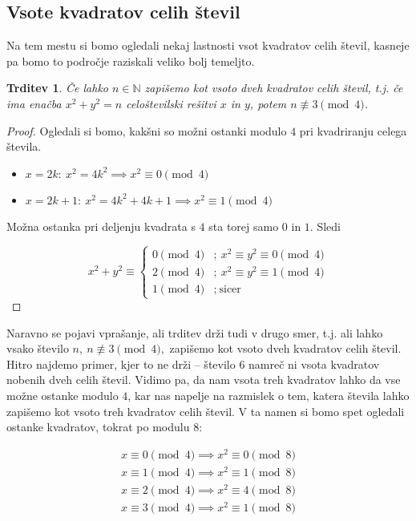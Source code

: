 \documentclass[12pt, a4paper]{article}
\newtheorem{trd}{Trditev}
\begin{document}
\subsection{Vsote kvadratov celih števil}

Na tem mestu si bomo ogledali nekaj lastnosti vsot kvadratov celih števil, kasneje pa bomo to področje raziskali veliko bolj temeljto.

\begin{trd}
Če lahko $n\in \mathbb{N}$ zapišemo kot vsoto dveh kvadratov celih števil, t.j. če ima enačba $x^2 + y^2 = n$ celoštevilski rešitvi $x$ in $y$, potem $n\not\equiv 3 \pmod{4}$.
\end{trd}

\begin{proof}
Ogledali si bomo, kakšni so možni ostanki modulo $4$ pri kvadriranju celega števila.
\begin{itemize}
\item $x=2k:\ x^2 = 4k^2 \implies x^2 \equiv 0 \pmod4$
\item $x=2k+1:\ x^2= 4k^2 + 4k + 1 \implies x^2 \equiv 1 \pmod4$
\end{itemize}
Možna ostanka pri deljenju kvadrata s $4$ sta torej samo $0$ in $1$. Sledi

\[
x^2 + y^2\equiv
\begin{cases}
0 \pmod4 &;\ x^2\equiv y^2 \equiv 0 \pmod4 \\
2 \pmod4 &;\ x^2\equiv y^2 \equiv 1 \pmod4 \\
1 \pmod4 &;\ \text{sicer}
\end{cases}
\]
\end{proof}

Naravno se pojavi vprašanje, ali trditev drži tudi v drugo smer, t.j. ali lahko vsako število $n,\ n\not\equiv 3 \pmod4,$ zapišemo kot vsoto dveh kvadratov celih števil. Hitro najdemo primer, kjer to ne drži -- število $6$ namreč ni vsota kvadratov nobenih dveh celih števil. Vidimo pa, da nam vsota treh kvadratov lahko da vse možne ostanke modulo $4$, kar nas napelje na razmislek o tem, katera števila lahko zapišemo kot vsoto treh kvadratov celih števil. V ta namen si bomo spet ogledali ostanke kvadratov, tokrat po modulu $8$:

\begin{align*}
x\equiv 0 \pmod4 \implies x^2 \equiv 0 \pmod8 \\
x\equiv 1 \pmod4 \implies x^2 \equiv 1 \pmod8 \\
x\equiv 2 \pmod4 \implies x^2 \equiv 4 \pmod8 \\
x\equiv 3 \pmod4 \implies x^2 \equiv 1 \pmod8
\end{align*}
\end{document}
